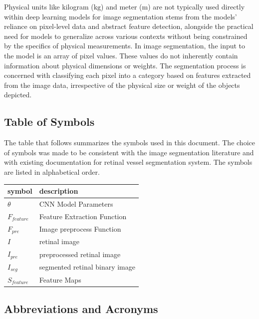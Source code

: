 \documentclass[12pt]{article}
\begin{document}
Physical units like kilogram ($\si{\kilogram}$) and meter ($\si{\metre}$) are not typically used directly within deep learning models for image segmentation stems from the models' reliance on pixel-level data and abstract feature detection, alongside the practical need for models to generalize across various contexts without being constrained by the specifics of physical measurements. In image segmentation, the input to the model is an array of pixel values. These values do not inherently contain information about physical dimensions or weights. The segmentation process is concerned with classifying each pixel into a category based on features extracted from the image data, irrespective of the physical size or weight of the objects depicted.


\subsection{Table of Symbols}

The table that follows summarizes the symbols used in this document. The choice of symbols was made to be consistent with the image segmentation literature and with existing documentation for retinal vessel segmentation system. The symbols are listed in alphabetical order.

\renewcommand{\arraystretch}{1.2}
\noindent 
\begin{longtable*}{l l} 
    \toprule
    \textbf{symbol} & \textbf{description}\\
    \midrule 
    $\theta$ & CNN Model Parameters\\
    $F_{feature}$ & Feature Extraction Function \\
    $F_{pre}$ & Image preprocess Function\\
    $I$ & retinal image\\ 
    $I_{pre}$ & preprocessed retinal image\\ 
    $I_{seg}$ & segmented retinal binary image\\
    $S_{feature}$ & Feature Maps \\
   
    \bottomrule
\end{longtable*}

\subsection{Abbreviations and Acronyms}
\end{document}
